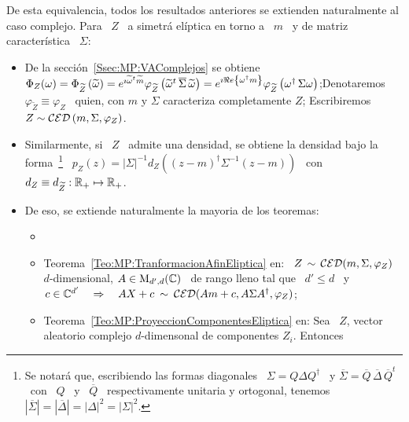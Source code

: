 De esta equivalencia, todos  los resultados anteriores se extienden naturalmente
al caso  complejo. Para \ $Z$ \  a simetr\'a el\'iptica en  torno a \ $m$  \ y de
matriz caracter\'istica \ $\Sigma$:
%
\begin{itemize}
\item  De la  secci\'on~\ref{Ssec:MP:VAComplejos} se  obtiene  $\Phi_Z(\omega) =
  \Phi_{\widetilde{Z}}\left(    \widetilde{\omega}     \right)    =    e^{\imath
    \widetilde{\omega}^t       \widetilde{m}}      \varphi_{\widetilde{Z}}\left(
    \widetilde{\omega}^t  \, \overline{\Sigma}  \, \widetilde{\omega}  \right) =
  e^{\imath  \Re e \left\{ \omega^\dag m \right\}} \varphi_{\widetilde{Z}}\left(  \omega^\dag \,
    \Sigma \omega  \right)$;\newline Denotaremos $\varphi_{\widetilde{Z}} \equiv
  \varphi_Z$ \ quien, con  $m$ y $\Sigma$ caracteriza completamente $Z$;\newline
  Escribiremos $Z \sim \mathcal{CED}\left( m , \Sigma , \varphi_Z \right)$.
%
\item Similarmente, si \ $Z$ \  admite una densidad, se obtiene la densidad bajo
  la  forma~\footnote{Se  notar\'a  que,  escribiendo las  formas  diagonales  \
    $\Sigma  =  Q  \Delta  Q^\dag$  \ y  $\overline{\Sigma}  =  \overline{Q}  \,
    \overline{\Delta}  \, \overline{Q}^t$ \  con \  $Q$ \  y \  $\overline{Q}$ \
    respectivamente  unitaria y ortogonal,  tenemos \  $\left| \overline{\Sigma}
    \right|  = \left|  \overline{\Delta}  \right| =  \left|  \Delta \right|^2  =
    \left| \Sigma  \right|^2$.}  \ $p_Z(z) =  |\Sigma|^{-1} d_Z\left( (z-m)^\dag
    \Sigma^{-1} (z-m)  \right)$ \ con  \ $d_Z \equiv  d_{\widetilde{Z}}: \mathbb{R}_+
  \mapsto \mathbb{R}_+$.
%
\item  De eso,  se extiende  naturalmente la mayoria de los teoremas:
%
  \begin{itemize}
  \item  {}~\cite{Kri76}
  \item  Teorema~\ref{Teo:MP:TranformacionAfinEliptica}  en:  \  $Z \,  \sim  \,
    \mathcal{CED}(m,\Sigma,\varphi_Z)$ \  $d$-dimensional, $A \in  \mathrm{M}_{d',d}(\mathbb{C})$ \ de
    rango lleno tal que  \ $d' \le d$ \ y \  $c \in \mathbb{C}^{d'} \quad \Rightarrow
    \quad A X + c \: \sim \: \mathcal{CED}(A m + c , A \Sigma A^\dag , \varphi_Z)$;
  \item Teorema~\ref{Teo:MP:ProyeccionComponentesEliptica} en: Sea \ $Z$, vector
    aleatorio   complejo   $d$-dimensonal   de   componentes   $Z_i$.   Entonces

\end{itemize}
\end{itemize}
